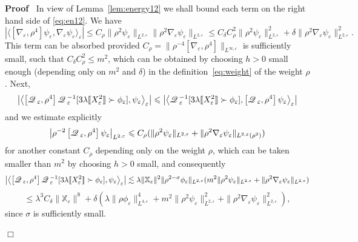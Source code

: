 \documentclass[a4paper,11pt]{article}
\newenvironment{proof}{\noindent\textbf{Proof\ }}{\hspace*{\fill}$\Box$\medskip}
\numberwithin{equation}{section}
\newcommand{\Q}{\mathscr{Q} \hspace{.2em}}
\begin{document}
\begin{proof}
  In view of Lemma~\ref{lem:energy12} we shall bound each term on the right
  hand side of {\eqref{eq:en12}}. We have
  \[ | \langle [\nabla_{\varepsilon}, \rho^4] \psi_{\varepsilon},
     \nabla_{\varepsilon} \psi_{\varepsilon} \rangle_{\varepsilon} | \leqslant
     C_{\rho}  \| \rho^2 \psi_{\varepsilon} \|_{L^{2, \varepsilon}}  \| \rho^2
     \nabla_{\varepsilon} \psi_{\varepsilon} \|_{L^{2, \varepsilon}} \leqslant
     C_{\delta} C_{\rho}^2  \| \rho^2 \psi_{\varepsilon} \|^2_{L^{2,
     \varepsilon}} + \delta \| \rho^2 \nabla_{\varepsilon} \psi_{\varepsilon}
     \|^2_{L^{2, \varepsilon}} . \]
  This term can be absorbed provided $C_{\rho} = \| \rho^{- 4}
  [\nabla_{\varepsilon}, \rho^4]\|_{L^{\infty, \varepsilon}}$ is sufficiently
  small, such that $C_{\delta} C^2_{\rho} \leqslant m^2$, which can be
  obtained by choosing $h > 0$ small enough (depending only on $m^2$ and
  $\delta$) in the definition~{\eqref{eq:weight}} of the weight $\rho$. Next,
  \[ \left| \left\langle \left[ \Q_{\varepsilon}, \rho^4 \right]
     \Q_{\varepsilon}^{- 1} [3 \lambda \llbracket X_{\varepsilon}^2 \rrbracket
     \succ \phi_{\varepsilon}], \psi_{\varepsilon} \right\rangle_{\varepsilon}
     \right| \leqslant \left| \left\langle \Q_{\varepsilon}^{- 1} [3 \lambda
     \llbracket X_{\varepsilon}^2 \rrbracket \succ \phi_{\varepsilon}], \left[
     \Q_{\varepsilon}, \rho^4 \right] \psi_{\varepsilon}
     \right\rangle_{\varepsilon} \right| \]
  and we estimate explicitly
  \[ \left| \rho^{- 2} \left[ \Q_{\varepsilon}, \rho^4 \right]
     \psi_{\varepsilon} \right|_{L^{2, \varepsilon}} \leqslant C_{\rho}  (\|
     \rho^2 \psi_{\varepsilon} \|_{L^{2, \varepsilon}} +\| \rho^2
     \nabla_{\varepsilon} \psi_{\varepsilon} \|_{L^{2, \varepsilon} (\rho^2)})
  \]
  for another constant $C_{\rho}$ depending only on the weight $\rho$, which
  can be taken smaller than $m^2$ by choosing $h > 0$ small, and consequently
  \[ \left| \left\langle \left[ \Q_{\varepsilon}, \rho^4 \right]
     \Q_{\varepsilon}^{- 1} [3 \lambda \llbracket X_{\varepsilon}^2 \rrbracket
     \succ \phi_{\varepsilon}], \psi_{\varepsilon} \right\rangle_{\varepsilon}
     \right| \lesssim \lambda \|\mathbb{X}_{\varepsilon} \|^2  \| \rho^{2 -
     \sigma} \phi_{\varepsilon} \|_{L^{2, \varepsilon}}  (m^2 \| \rho^2
     \psi_{\varepsilon} \|_{L^{2, \varepsilon}} +\| \rho^2
     \nabla_{\varepsilon} \psi_{\varepsilon} \|_{L^{2, \varepsilon}}) \]
  \[ \leqslant \lambda^3 C_{\delta} \|\mathbb{X}_{\varepsilon} \|^8 + \delta
     (\lambda \| \rho \phi_{\varepsilon} \|^4_{L^{4, \varepsilon}} + m^2 \|
     \rho^2 \psi_{\varepsilon} \|^2_{L^{2, \varepsilon}} +\| \rho^2
     \nabla_{\varepsilon} \psi_{\varepsilon} \|^2_{L^{2, \varepsilon}}), \]
  since $\sigma$ is sufficiently small.
  

\end{proof}
\end{document}
